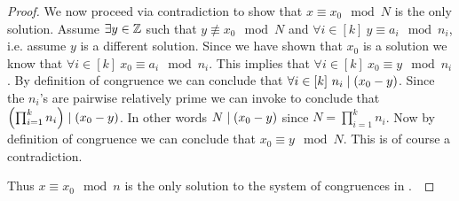\begin{proof}
            We now proceed via contradiction to show that $x \equiv x_0 \mod N$ is the only solution.
            Assume $\exists y \in \mathbb{Z}$ such that $y \not\equiv x_0 \mod N$ and 
            $\forall i \in [k] \ y \equiv a_i \mod n_i$, i.e. assume $y$ is a different solution. 
            Since we have shown that $x_0$
            is a solution we know that $\forall i \in [k] \ x_0 \equiv a_i \mod n_i$.
            This implies that $\forall i \in [k] \ x_0 \equiv y \mod n_i$. By definition
            of congruence we can conclude that $\forall i \in [k] \ n_i \mid (x_0 - y)$.
            Since the $n_i$'s are pairwise relatively prime we can invoke
             to conclude that
            $\left(\prod_{i = 1}^{k} n_i\right) \mid (x_0 - y)$.
            In other words $N \mid (x_0 - y)$ since $N = \prod_{i = 1}^{k} n_i$.
            Now by definition of congruence we can conclude that $x_0 \equiv y \mod N$.
            This is of course a contradiction.

            Thus $x \equiv x_0 \mod n$ is the only solution to
            the system of congruences in .~\QED
        \end{proof}
